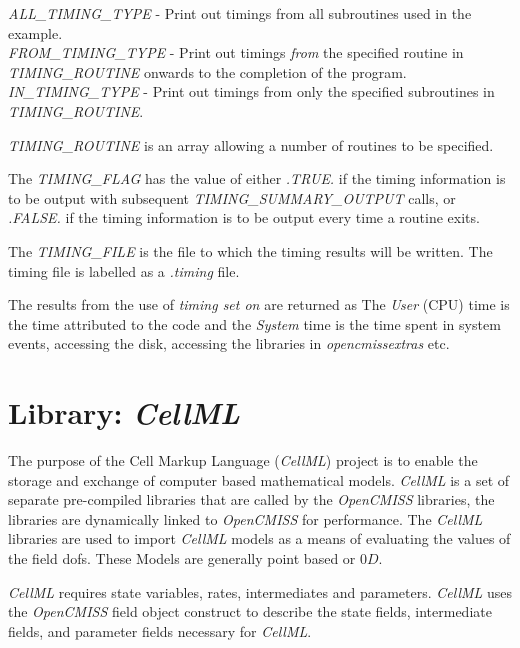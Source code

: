 \noindent \emph{ALL\_TIMING\_TYPE} - Print out timings 
from all subroutines used in the example. \\
\emph{FROM\_TIMING\_TYPE} - Print out timings \emph{from} 
the specified routine in \\
\emph{TIMING\_ROUTINE} onwards to the completion of the program. \\
\emph{IN\_TIMING\_TYPE} - Print out timings from only the 
specified subroutines in \emph{TIMING\_ROUTINE}. \\
\linebreak

\noindent \emph{TIMING\_ROUTINE} is an array allowing a number of 
routines to be specified.

The \emph{TIMING\_FLAG} has the value of either \emph{.TRUE.} 
if the timing information is to be output with subsequent 
\emph{TIMING\_SUMMARY\_OUTPUT} calls, or \emph{.FALSE.} 
if the timing information is to be output every time a 
routine exits.

The \emph{TIMING\_FILE} is the file to which the timing results  
will be written. The timing file is labelled as a \emph{.timing} file.

The results from the use of \emph{timing set on} are returned as 
The \emph{User} (CPU) time is the time attributed to the code and the 
\emph{System} time is the time spent in system events, accessing the 
disk, accessing the libraries in \emph{opencmissextras} etc. 


\section{Library: \emph{CellML}}
\label{sec:cellml}

The purpose of the Cell Markup Language (\emph{CellML}) project is to enable 
the storage and exchange of computer based mathematical models. \emph{CellML} 
is a set of separate pre-compiled libraries that are called by the 
\emph{OpenCMISS} libraries, the libraries are dynamically linked to
\emph{OpenCMISS} for performance. The \emph{CellML} libraries are used to 
import \emph{CellML} models as a means of evaluating the values of the field 
dofs. These Models are generally point based or $0D$. 

\emph{CellML} requires state variables, rates, intermediates and parameters. 
\emph{CellML} uses the \emph{OpenCMISS} field object construct to describe the
state fields, intermediate fields, and parameter fields necessary for 
\emph{CellML}.

